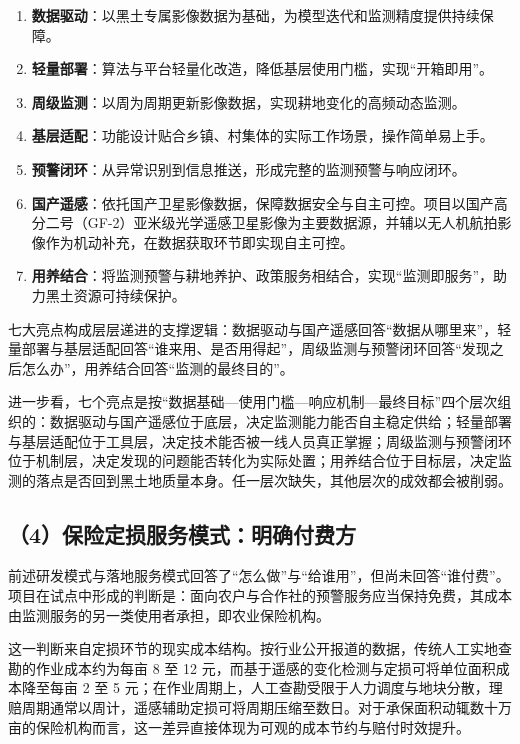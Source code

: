 \documentclass[12pt, a4paper]{ctexart}
\begin{document}
\begin{enumerate}
  \item \textbf{数据驱动}：以黑土专属影像数据为基础，为模型迭代和监测精度提供持续保障。
  \item \textbf{轻量部署}：算法与平台轻量化改造，降低基层使用门槛，实现“开箱即用”。
  \item \textbf{周级监测}：以周为周期更新影像数据，实现耕地变化的高频动态监测。
  \item \textbf{基层适配}：功能设计贴合乡镇、村集体的实际工作场景，操作简单易上手。
  \item \textbf{预警闭环}：从异常识别到信息推送，形成完整的监测预警与响应闭环。
  \item \textbf{国产遥感}：依托国产卫星影像数据，保障数据安全与自主可控。项目以国产高分二号（GF-2）亚米级光学遥感卫星影像为主要数据源，并辅以无人机航拍影像作为机动补充，在数据获取环节即实现自主可控。
  \item \textbf{用养结合}：将监测预警与耕地养护、政策服务相结合，实现“监测即服务”，助力黑土资源可持续保护。
\end{enumerate}

七大亮点构成层层递进的支撑逻辑：数据驱动与国产遥感回答“数据从哪里来”，轻量部署与基层适配回答“谁来用、是否用得起”，周级监测与预警闭环回答“发现之后怎么办”，用养结合回答“监测的最终目的”。

进一步看，七个亮点是按“数据基础—使用门槛—响应机制—最终目标”四个层次组织的：数据驱动与国产遥感位于底层，决定监测能力能否自主稳定供给；轻量部署与基层适配位于工具层，决定技术能否被一线人员真正掌握；周级监测与预警闭环位于机制层，决定发现的问题能否转化为实际处置；用养结合位于目标层，决定监测的落点是否回到黑土地质量本身。任一层次缺失，其他层次的成效都会被削弱。

\subsection{（4）保险定损服务模式：明确付费方}

前述研发模式与落地服务模式回答了“怎么做”与“给谁用”，但尚未回答“谁付费”。项目在试点中形成的判断是：面向农户与合作社的预警服务应当保持免费，其成本由监测服务的另一类使用者承担，即农业保险机构。

这一判断来自定损环节的现实成本结构。按行业公开报道的数据，传统人工实地查勘的作业成本约为每亩 8 至 12 元，而基于遥感的变化检测与定损可将单位面积成本降至每亩 2 至 5 元；在作业周期上，人工查勘受限于人力调度与地块分散，理赔周期通常以周计，遥感辅助定损可将周期压缩至数日。对于承保面积动辄数十万亩的保险机构而言，这一差异直接体现为可观的成本节约与赔付时效提升。
\end{document}
